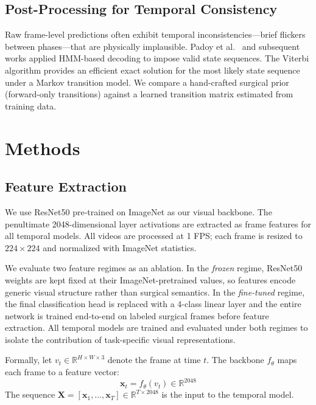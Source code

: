 \documentclass[10pt,twocolumn]{article}
\begin{document}
\subsection{Post-Processing for Temporal Consistency}

Raw frame-level predictions often exhibit temporal inconsistencies—brief flickers between phases—that are physically implausible. Padoy et al.\ \cite{padoy2012statistical} and subsequent works applied HMM-based decoding to impose valid state sequences. The Viterbi algorithm \cite{viterbi1967error} provides an efficient exact solution for the most likely state sequence under a Markov transition model. We compare a hand-crafted surgical prior (forward-only transitions) against a learned transition matrix estimated from training data.

\section{Methods}

\subsection{Feature Extraction}

We use ResNet50 \cite{he2016resnet} pre-trained on ImageNet \cite{deng2009imagenet} as our visual backbone. The penultimate 2048-dimensional layer activations are extracted as frame features for all temporal models. All videos are processed at 1 FPS; each frame is resized to $224 \times 224$ and normalized with ImageNet statistics.

We evaluate two feature regimes as an ablation. In the \emph{frozen} regime, ResNet50 weights are kept fixed at their ImageNet-pretrained values, so features encode generic visual structure rather than surgical semantics. In the \emph{fine-tuned} regime, the final classification head is replaced with a 4-class linear layer and the entire network is trained end-to-end on labeled surgical frames before feature extraction. All temporal models are trained and evaluated under both regimes to isolate the contribution of task-specific visual representations.

Formally, let $v_t \in \mathbb{R}^{H \times W \times 3}$ denote the frame at time $t$. The backbone $f_\theta$ maps each frame to a feature vector:
\[
\mathbf{x}_t = f_\theta(v_t) \in \mathbb{R}^{2048}
\]
The sequence $\mathbf{X} = [\mathbf{x}_1, \ldots, \mathbf{x}_T] \in \mathbb{R}^{T \times 2048}$ is the input to the temporal model.
\end{document}
